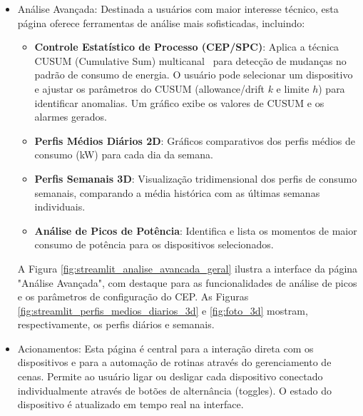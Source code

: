 \begin{itemize}
    \item Análise Avançada: Destinada a usuários com maior interesse técnico, esta página oferece ferramentas de análise mais sofisticadas, incluindo:
    \begin{itemize}
        \item \textbf{Controle Estatístico de Processo (CEP/SPC)}: Aplica a técnica CUSUM (Cumulative Sum) multicanal~\cite{Braga2010TeseValidacao} para detecção de mudanças no padrão de consumo de energia. O usuário pode selecionar um dispositivo e ajustar os parâmetros do CUSUM (allowance/drift $k$ e limite $h$) para identificar anomalias. Um gráfico exibe os valores de CUSUM e os alarmes gerados.
        \item \textbf{Perfis Médios Diários 2D}: Gráficos comparativos dos perfis médios de consumo (kW) para cada dia da semana.
        \item \textbf{Perfis Semanais 3D}: Visualização tridimensional dos perfis de consumo semanais, comparando a média histórica com as últimas semanas individuais.
        \item \textbf{Análise de Picos de Potência}: Identifica e lista os momentos de maior consumo de potência para os dispositivos selecionados.
    \end{itemize}
    A Figura \ref{fig:streamlit_analise_avancada_geral} ilustra a interface da página "Análise Avançada", com destaque para as funcionalidades de análise de picos e os parâmetros de configuração do CEP. As Figuras \ref{fig:streamlit_perfis_medios_diarios_3d} e \ref{fig:foto_3d} mostram, respectivamente, os perfis diários e semanais.

    \item Acionamentos: Esta página é central para a interação direta com os dispositivos e para a automação de rotinas através do gerenciamento de cenas.
    Permite ao usuário ligar ou desligar cada dispositivo conectado individualmente através de botões de alternância (toggles). O estado do dispositivo é atualizado em tempo real na interface.


\end{itemize}
